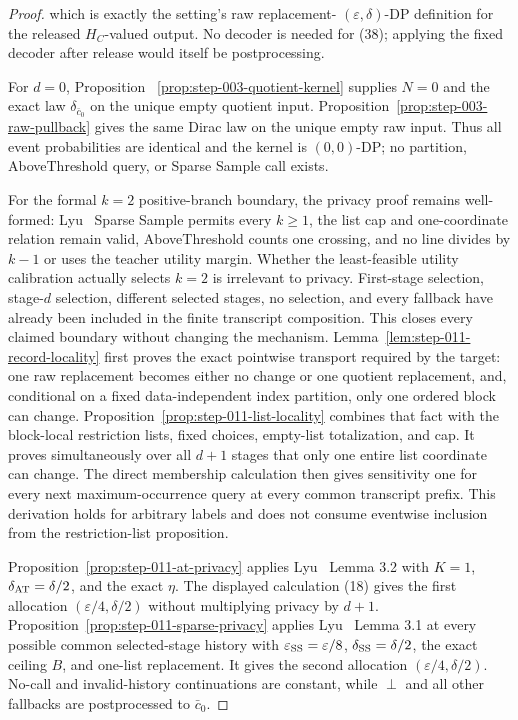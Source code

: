 \begin{proof}
which is exactly the setting's raw replacement-
\((\varepsilon,\delta)\)-DP definition for the released \(H_C\)-valued
output. No decoder is needed for (38); applying the fixed decoder after
release would itself be postprocessing.

For \(d=0\), Proposition
~\ref{prop:step-003-quotient-kernel} supplies \(N=0\) and the exact law
\(\delta_{\bar c_0}\) on the unique empty quotient input. Proposition~\ref{prop:step-003-raw-pullback} gives the same Dirac law on the
unique empty raw input. Thus all event probabilities are identical and the
kernel is \((0,0)\)-DP; no partition, AboveThreshold query, or Sparse Sample
call exists.

For the formal \(k=2\) positive-branch boundary, the privacy proof remains
well-formed: Lyu~\citep{lyu2025} Sparse Sample permits every \(k\geq1\), the list cap and
one-coordinate relation remain valid, AboveThreshold counts one crossing,
and no line divides by \(k-1\) or uses the teacher utility margin. Whether
the  least-feasible utility calibration actually selects \(k=2\)
is irrelevant to privacy. First-stage selection, stage-\(d\) selection,
different selected stages, no selection, and every fallback have already
been included in the finite transcript composition. This closes every
claimed boundary without changing the mechanism. 
Lemma~\ref{lem:step-011-record-locality} first proves the exact pointwise
transport required by the target: one raw replacement becomes either no
change or one quotient replacement, and, conditional on a fixed
data-independent index partition, only one ordered block can change.
Proposition~\ref{prop:step-011-list-locality} combines that fact with the
 block-local restriction lists, fixed choices, empty-list
totalization, and cap. It proves simultaneously over all \(d+1\) stages
that only one entire list coordinate can change. The direct membership
calculation then gives sensitivity one for every next maximum-occurrence
query at every common transcript prefix. This derivation holds for arbitrary
labels and does not consume eventwise inclusion from the restriction-list
proposition.

Proposition~\ref{prop:step-011-at-privacy} applies Lyu~\citep{lyu2025} Lemma 3.2
with \(K=1\), \(\delta_{\rm AT}=\delta/2\), and the exact  \(\eta\).
The displayed calculation (18) gives the first allocation
\((\varepsilon/4,\delta/2)\) without multiplying privacy by \(d+1\).
Proposition~\ref{prop:step-011-sparse-privacy} applies Lyu~\citep{lyu2025} Lemma 3.1
at every possible common selected-stage history with
\(\varepsilon_{\rm SS}=\varepsilon/8\),
\(\delta_{\rm SS}=\delta/2\), the exact ceiling \(B\), and one-list
replacement. It gives the second allocation
\((\varepsilon/4,\delta/2)\). No-call and invalid-history continuations are
constant, while \(\perp\) and all other fallbacks are postprocessed to
\(\bar c_0\).


\end{proof}
